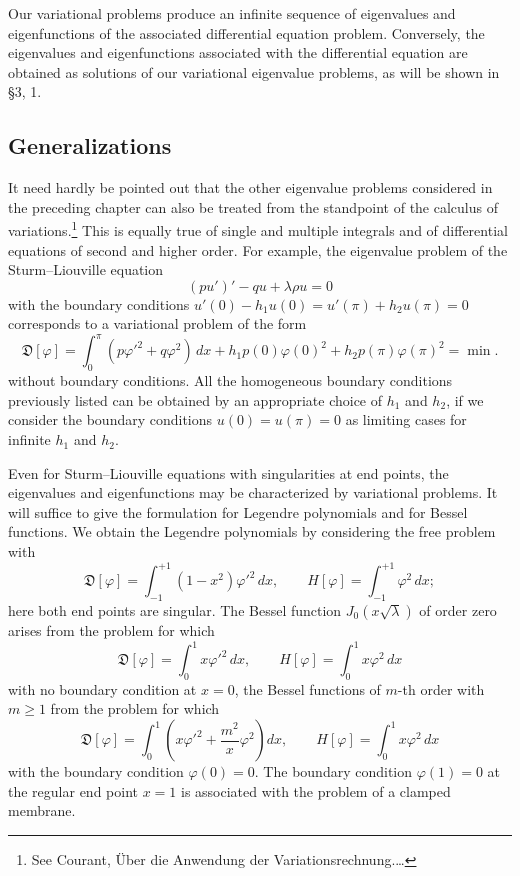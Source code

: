 Our variational problems produce an infinite sequence of eigenvalues and eigenfunctions of the associated differential equation problem. Conversely, the eigenvalues and eigenfunctions associated with the differential equation are obtained as solutions of our variational eigenvalue problems, as will be shown in \S3, 1.

\subsection{Generalizations}
It need hardly be pointed out that the other eigenvalue problems considered in the preceding chapter can also be treated from the standpoint of the calculus of variations.\footnote{See Courant, \"Uber die Anwendung der Variationsrechnung.\ldots} This is equally true of single and multiple integrals and of differential equations of second and higher order. For example, the eigenvalue problem of the Sturm--Liouville equation
\[
(pu')'-qu+\lambda\rho u=0
\]
with the boundary conditions $u'(0)-h_1u(0)=u'(\pi)+h_2u(\pi)=0$ corresponds to a variational problem of the form
\[
\mathfrak D[\varphi]=\int_0^\pi(p\varphi'^2+q\varphi^2)\,dx
+h_1p(0)\varphi(0)^2+h_2p(\pi)\varphi(\pi)^2=\min.
\]
without boundary conditions. All the homogeneous boundary conditions previously listed can be obtained by an appropriate choice of $h_1$ and $h_2$, if we consider the boundary conditions $u(0)=u(\pi)=0$ as limiting cases for infinite $h_1$ and $h_2$.

Even for Sturm--Liouville equations with singularities at end points, the eigenvalues and eigenfunctions may be characterized by variational problems. It will suffice to give the formulation for Legendre polynomials and for Bessel functions. We obtain the Legendre polynomials by considering the free problem with
\[
\mathfrak D[\varphi]=\int_{-1}^{+1}(1-x^2)\varphi'^2\,dx,
\qquad
H[\varphi]=\int_{-1}^{+1}\varphi^2\,dx;
\]
here both end points are singular. The Bessel function $J_0(x\sqrt\lambda)$ of order zero arises from the problem for which
\[
\mathfrak D[\varphi]=\int_0^1x\varphi'^2\,dx,
\qquad
H[\varphi]=\int_0^1x\varphi^2\,dx
\]
with no boundary condition at $x=0$, the Bessel functions of $m$-th order with $m\ge1$ from the problem for which
\[
\mathfrak D[\varphi]=\int_0^1\left(x\varphi'^2+\frac{m^2}{x}\varphi^2\right)dx,
\qquad
H[\varphi]=\int_0^1x\varphi^2\,dx
\]
with the boundary condition $\varphi(0)=0$. The boundary condition $\varphi(1)=0$ at the regular end point $x=1$ is associated with the problem of a clamped membrane.


